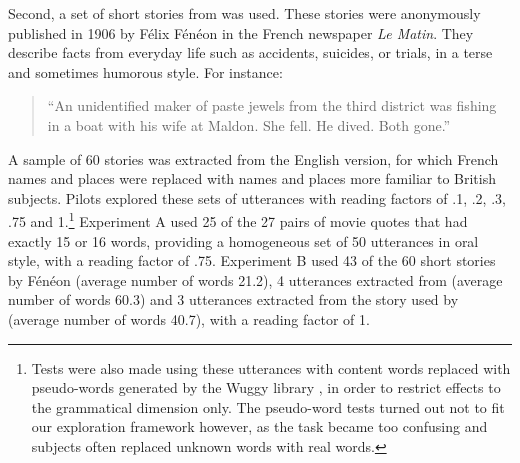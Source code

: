 \documentclass[a4paper,fleqn]{cas-dc}
\begin{document}
Second, a set of short stories from \citet{feneon_novels_2007} was used. These
stories were anonymously published in 1906 by Félix Fénéon in the French
newspaper \emph{Le Matin}. They describe facts from everyday life such as
accidents, suicides, or trials, in a terse and sometimes humorous style. For
instance:

\begin{quote}
\enquote{An unidentified maker of paste jewels from the third district
was fishing in a boat with his wife at Maldon. She fell. He dived. Both
gone.}
\end{quote}

A sample of 60 stories was extracted from the English version, for which
French names and places were replaced with names and places more
familiar to British subjects. Pilots explored these sets of utterances
with reading factors of .1, .2, .3, .75 and 1.\footnote{Tests were also
made using these utterances with content words replaced with
pseudo-words generated by the Wuggy library \citep{keuleers_wuggy:_2010}, in order to restrict effects to the grammatical dimension only. The pseudo-word tests turned out not
to fit our exploration framework however, as the task became too
confusing and subjects often replaced unknown words with real words.}
Experiment A used 25 of the 27 pairs of movie quotes that had exactly 15
or 16 words, providing a homogeneous set of 50 utterances in oral style,
with a reading factor of .75. Experiment B used 43 of the 60 short
stories by Fénéon (average number of words \num{21.2}), 4
utterances extracted from \citet{mesoudi_bias_2006} (average number
of words \num{60.3}) and 3 utterances extracted from the story used by
\citet{maxwell_remembering_1936} (average number of words
\num{40.7}), with a reading factor of 1.







\end{document}
